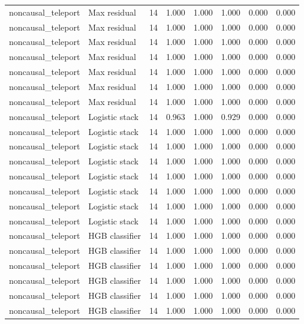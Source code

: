 {\begin{longtable}{llrrrrrr}
noncausal\_teleport & Max residual & 14 & 1.000 & 1.000 & 1.000 & 0.000 & 0.000 \\
noncausal\_teleport & Max residual & 14 & 1.000 & 1.000 & 1.000 & 0.000 & 0.000 \\
noncausal\_teleport & Max residual & 14 & 1.000 & 1.000 & 1.000 & 0.000 & 0.000 \\
noncausal\_teleport & Max residual & 14 & 1.000 & 1.000 & 1.000 & 0.000 & 0.000 \\
noncausal\_teleport & Max residual & 14 & 1.000 & 1.000 & 1.000 & 0.000 & 0.000 \\
noncausal\_teleport & Max residual & 14 & 1.000 & 1.000 & 1.000 & 0.000 & 0.000 \\
noncausal\_teleport & Max residual & 14 & 1.000 & 1.000 & 1.000 & 0.000 & 0.000 \\
noncausal\_teleport & Logistic stack & 14 & 0.963 & 1.000 & 0.929 & 0.000 & 0.000 \\
noncausal\_teleport & Logistic stack & 14 & 1.000 & 1.000 & 1.000 & 0.000 & 0.000 \\
noncausal\_teleport & Logistic stack & 14 & 1.000 & 1.000 & 1.000 & 0.000 & 0.000 \\
noncausal\_teleport & Logistic stack & 14 & 1.000 & 1.000 & 1.000 & 0.000 & 0.000 \\
noncausal\_teleport & Logistic stack & 14 & 1.000 & 1.000 & 1.000 & 0.000 & 0.000 \\
noncausal\_teleport & Logistic stack & 14 & 1.000 & 1.000 & 1.000 & 0.000 & 0.000 \\
noncausal\_teleport & Logistic stack & 14 & 1.000 & 1.000 & 1.000 & 0.000 & 0.000 \\
noncausal\_teleport & Logistic stack & 14 & 1.000 & 1.000 & 1.000 & 0.000 & 0.000 \\
noncausal\_teleport & HGB classifier & 14 & 1.000 & 1.000 & 1.000 & 0.000 & 0.000 \\
noncausal\_teleport & HGB classifier & 14 & 1.000 & 1.000 & 1.000 & 0.000 & 0.000 \\
noncausal\_teleport & HGB classifier & 14 & 1.000 & 1.000 & 1.000 & 0.000 & 0.000 \\
noncausal\_teleport & HGB classifier & 14 & 1.000 & 1.000 & 1.000 & 0.000 & 0.000 \\
noncausal\_teleport & HGB classifier & 14 & 1.000 & 1.000 & 1.000 & 0.000 & 0.000 \\
noncausal\_teleport & HGB classifier & 14 & 1.000 & 1.000 & 1.000 & 0.000 & 0.000 \\

\end{longtable}}
